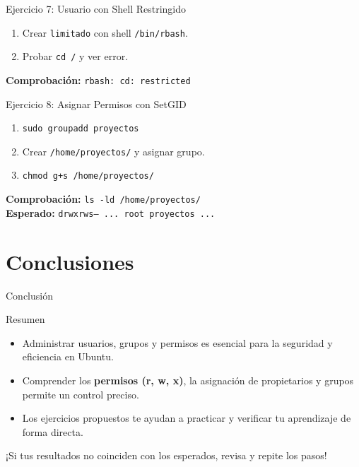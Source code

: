 \documentclass{beamer}
\begin{document}
\begin{frame}{Ejercicio 7: Usuario con Shell Restringido}
    \begin{enumerate}
        \item Crear \texttt{limitado} con shell \texttt{/bin/rbash}.
        \item Probar \texttt{cd /} y ver error.
    \end{enumerate}
    \textbf{Comprobación:} \texttt{rbash: cd: restricted}
\end{frame}

\begin{frame}{Ejercicio 8: Asignar Permisos con SetGID}
    \begin{enumerate}
        \item \texttt{sudo groupadd proyectos}
        \item Crear \texttt{/home/proyectos/} y asignar grupo.
        \item \texttt{chmod g+s /home/proyectos/}
    \end{enumerate}
    \textbf{Comprobación:} \texttt{ls -ld /home/proyectos/} \\
    \textbf{Esperado:} \texttt{drwxrws--- ... root proyectos ...}
\end{frame}

\section{Conclusiones}

\begin{frame}{Conclusión}
    \begin{block}{Resumen}
    \begin{itemize}
        \item Administrar usuarios, grupos y permisos es esencial para la seguridad y eficiencia en Ubuntu.
        \item Comprender los \textbf{permisos (r, w, x)}, la asignación de propietarios y grupos permite un control preciso.
        \item Los ejercicios propuestos te ayudan a practicar y verificar tu aprendizaje de forma directa.
    \end{itemize}
    \end{block}
    \vspace{0.5cm}
    \centering
    \alert{¡Si tus resultados no coinciden con los esperados, revisa y repite los pasos!}
\end{frame}

\end{document}
